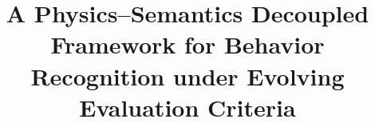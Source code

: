 \documentclass[a4paper,fleqn]{cas-sc}
\newcommand{\TODO}[1]{\textcolor{red}{\textbf{[TODO: #1]}}}
\begin{document}
\let\WriteBookmarks\relax
\def\floatpagepagefraction{1}
\def\textpagefraction{.001}


\title[mode = title]{A Physics--Semantics Decoupled Framework for Behavior Recognition under Evolving Evaluation Criteria}

\renewcommand{\casprelimstitle}{A Physics--Semantics Decoupled Framework\\ for Behavior Recognition\\ under Evolving Evaluation Criteria}%
\end{document}
